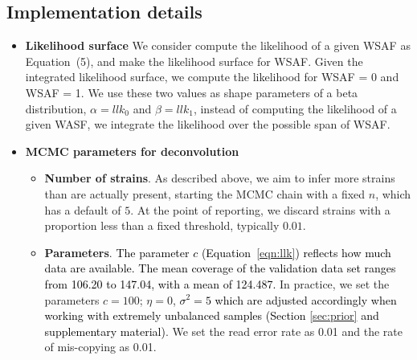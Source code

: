 \documentclass[9pt,lineno]{elife}
\begin{document}
\subsection{Implementation details}
\begin{itemize}


  \item {\bf Likelihood surface} We consider compute the likelihood of a given WSAF as \cite{Zhu2017} Equation~(5), and make the likelihood surface for WSAF. Given the integrated likelihood surface, we compute the likelihood for WSAF = 0 and WSAF = 1. We use these two values as shape parameters of a beta distribution, $\alpha = llk_{0}$ and $\beta = llk_{1}$, instead of computing the likelihood of a given WASF, we integrate the likelihood over the possible span of WSAF.


\item {\bf MCMC parameters for deconvolution}

\begin{itemize}
\item {\bf Number of strains}. As described above, we aim to infer more strains than are actually present, starting the MCMC chain with a fixed $n$, which has a default of $5$. At the point of reporting, we discard strains with a proportion less than a fixed threshold, typically $0.01$.

\item {\bf Parameters}. \textcolor{black}{The parameter $c$ (Equation~\eqref{eqn:llk}) reflects how much data are available. The mean coverage of the validation data set ranges from 106.20 to 147.04, with a mean of 124.487.} In practice, we set the parameters $c=100$; $\eta = 0$, \textcolor{black}{$\sigma^2 = 5$ which are adjusted accordingly when working with extremely unbalanced samples (Section \ref{sec:prior} and supplementary material)}.  We set the read error rate as 0.01 and the rate of mis-copying as 0.01.


\end{itemize}
\end{itemize}
\end{document}
